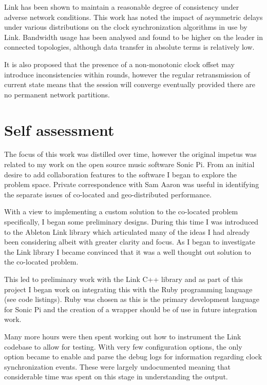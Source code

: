 \documentclass[11pt]{article} %
\theoremstyle{plain}
\theoremstyle{definition}
\begin{document}
Link has been shown to maintain a reasonable degree of consistency under
adverse network conditions. This work has noted the impact of asymmetric delays
under various distributions on the clock synchronization algorithms in use by
Link. Bandwidth usage has been analysed and found to be higher on the leader in
connected topologies, although data transfer in absolute terms is relatively
low.

It is also proposed that the presence of a non-monotonic clock offset may
introduce inconsistencies within rounds, however the regular retransmission of
current state means that the session will converge eventually provided there
are no permanent network partitions.




\appendix
\section{Self assessment}

The focus of this work was distilled over time, however the original impetus
was related to my work on the open source music software Sonic
Pi\cite{sonicpi}. From an initial desire to add collaboration features to the
software I began to explore the problem space. Private correspondence with Sam
Aaron was useful in identifying the separate issues of co-located and
geo-distributed performance.

With a view to implementing a custom solution to the co-located problem
specifically, I began some preliminary designs. During this time I was
introduced to the Ableton Link library which articulated many of the ideas I
had already been considering albeit with greater clarity and focus. As I began
to investigate the Link library I became convinced that it was a well thought
out solution to the co-located problem.

This led to preliminary work with the Link C++ library and as part of this
project I began work on integrating this with the Ruby programming language
(see code listings). Ruby was chosen as this is the primary development
language for Sonic Pi and the creation of a wrapper should be of use in future
integration work.

Many more hours were then spent working out how to
instrument the Link codebase to allow for testing. With very few configuration
options, the only option became to enable and parse the debug logs for
information regarding clock synchronization events. These were largely
undocumented meaning that considerable time was spent on this stage in
understanding the output.
\end{document}
